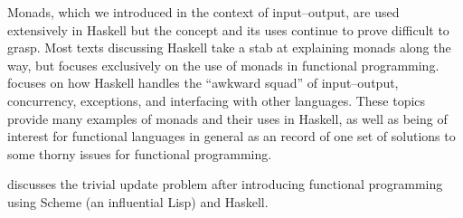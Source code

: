 Monads, which we introduced in the context of input--output, are used extensively in Haskell but the concept and its uses continue to prove difficult to grasp. Most texts discussing Haskell take a stab at explaining monads along the way, but \citet{Wadler:Monads:1995} focuses exclusively on the use of monads in functional programming. \citet{Peyton-Jones:Tackling:2000} focuses on how Haskell handles the ``awkward squad'' of input--output, concurrency, exceptions, and interfacing with other languages. These topics provide many examples of monads and their uses in Haskell, as well as being of interest for functional languages in general as an record of one set of solutions to some thorny issues for functional programming.

\citet{Scott:Programming:2006} discusses the trivial update problem after introducing functional programming using Scheme (an influential Lisp) and Haskell.